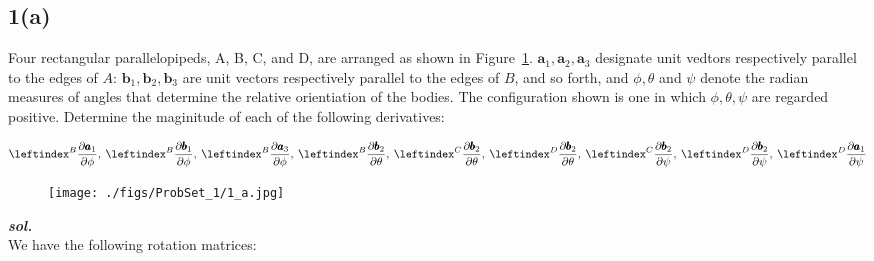 \subsection{1(a)}
Four rectangular parallelopipeds, A, B, C, and D, are arranged as shown in Figure~\ref{1_a}.
$\pmb a_1, \pmb a_2, \pmb a_3$ designate unit vedtors respectively parallel to the edges of $A$: $\pmb b_1, \pmb b_2, \pmb b_3$ are unit vectors respectively parallel to the edges of $B$, and so forth, and $\phi, \theta$ and $\psi$ denote the radian measures of angles that determine the relative orientiation of the bodies.
The configuration shown is one in which $\phi, \theta, \psi$ are regarded positive. Determine the maginitude of each of the following derivatives:

\begin{align*}
  \lx{^B}{\frac {\partial \pmb a_1}  {\partial \phi}}, \:
  \lx{^B}{\frac {\partial \pmb b_1}  {\partial \phi}}, \:
  \lx{^B}{\frac {\partial \pmb a_3}  {\partial \phi}}, \:
  \lx{^B}{\frac {\partial \pmb b_2}  {\partial \theta}}, \:
  \lx{^C}{\frac {\partial \pmb b_2}  {\partial \theta}}, \:
  \lx{^D}{\frac {\partial \pmb b_2}  {\partial \theta}}, \:
  \lx{^C}{\frac {\partial \pmb b_2}  {\partial \psi}}, \:
  \lx{^D}{\frac {\partial \pmb b_2}  {\partial \psi}}, \:
  \lx{^D}{\frac {\partial \pmb a_1}  {\partial \psi}}
\end{align*}

\begin{figure}[H]
    \centering
    \texttt{[image: ./figs/ProbSet\_1/1\_a.jpg]}
    \caption{}
    \label{1_a}
\end{figure}


\textbf{\textit{sol.}}\\

We have the following rotation matrices:

